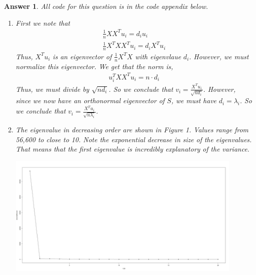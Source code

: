 \documentclass[12pt]{article}
\theoremstyle{colon}
\newtheorem*{answer}{Answer}
\begin{document}
\begin{answer}
  All code for this question is in the code appendix below.
  \begin{enumerate}[label=\arabic*)]
    \item First we note that
      \begin{gather*}
        \frac{1}{n} X X^T u_i = d_i u_i \\
        \frac{1}{n} X^T X X^T u_i = d_i X^T u_i
      \end{gather*}
      Thus, $X^T u_i$ is an eigenvector of $\frac{1}{n} X^T X$ with eigenvlaue $d_i$. However, we must normalize this eigenvector. We get that the norm is,
      \begin{gather*}
        u_i^T X X^T u_i = n \cdot d_i
      \end{gather*}
      Thus, we must divide by $\sqrt{n d_i}$. So we conclude that $v_i = \frac{X^T u_i}{\sqrt{n d_i}}$. However, since we now have an orthonormal eigenvector of $S$, we must have $d_i = \lambda_i$. So we conclude that $v_i = \frac{X^T u_i}{\sqrt{n \lambda_i}}$.

    \item The eigenvalue in decreasing order are shown in Figure 1. Values range from 56,600 to close to 10. Note the exponential decrease in size of the eigenvalues. That means that the first eigenvalue is incredibly explanatory of the variance.
      \begin{center}
        \includegraphics[width=0.9\textwidth]{eigenvalues.jpg}
      \end{center}


\end{enumerate}
\end{answer}
\end{document}
